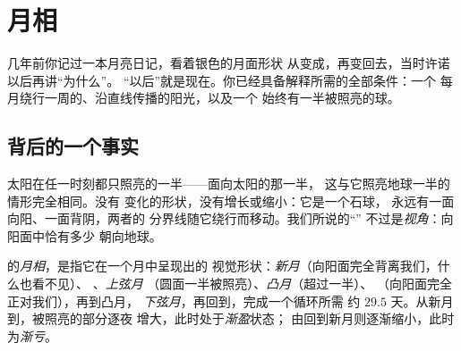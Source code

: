 \chapter{月相}\label{ch:g7:moon-phases}

几年前你记过一本月亮日记，看着银色的月面形状
从变成，再变回去，当时许诺以后再讲“为什么”。
“以后”就是现在。你已经具备解释所需的全部条件：一个
每月绕行一周的、沿直线传播的阳光，以及一个
始终有一半被照亮的球。

\section{背后的一个事实}

\begin{proposition}[始终有一半被照亮]\label{prop:g7:moon-phases:halflit}
太阳在任一时刻都只照亮的一半——面向太阳的那一半，
这与它照亮地球一半的情形完全相同。没有
变化的形状，没有增长或缩小：它是一个石球，
永远有一面向阳、一面背阴，两者的
分界线随它绕行而移动。我们所说的“”
不过是\emph{视角}：向阳面中恰有多少
朝向地球。
\end{proposition}

\begin{definition}[月相]\label{def:g7:moon-phases:phases}
的\emph{月相}，是指它在一个月中呈现出的
视觉形状：\emph{新月}（向阳面完全背离我们，什么也看不见）、
\emph{}、\emph{上弦月}
（圆面一半被照亮）、\emph{凸月}（超过一半）、
\emph{}（向阳面完全正对我们），再到凸月，
\emph{下弦月}，再回到，完成一个循环所需
约 $29.5$ 天。从新月到，被照亮的部分逐夜
增大，此时处于\emph{渐盈}状态；
由回到新月则逐渐缩小，此时为\emph{渐亏}。
\end{definition}

